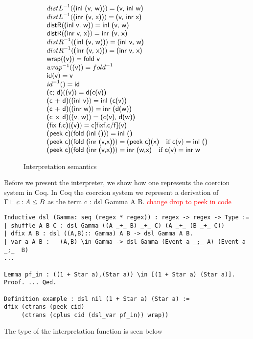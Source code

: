 \documentclass[a4paper,UKenglish,cleveref, autoref, thm-restate]{lipics-v2021}
\newcommand\mycomment[1]{\textcolor{red}{#1}}
\begin{document}
\begin{figure}
\begin{displaymath}
\begin{array}{l}
\iruleinv{distL}{(inl (v, w))}{(v, inl w)}\\
\iruleinv{distL}{(inr (v, x))}{(v, inr x)}\\
\irule{distR}{(inl v, w)}{inl (v, w)}\\
\irule{distR}{(inr v, x)}{inr (v, x)}\\
\iruleinv{distR}{(inl (v, w))}{(inl v, w)}\\
\iruleinv{distR}{(inr (v, x))}{(inr v, x)}\\
\irule{wrap}{(v)}{fold v}\\
\dslcominv{wrap}(\textsf{(v)})=\dslcominv{fold}\\
\irule{id}{v}{v}\\
\iruleinv{id}{}{id}\\
\irule{(c; d)}{(v)}{d(c(v))}\\
\irule{(c + d)}{(inl v)}{inl (c(v))}\\
\irule{(c + d)}{(inr w)}{inr (d(w))}\\
\irule{(c × d)}{(v, w)}{(c(v), d(w))}\\
\irule{(fix f.c)}{(v)}{c[fixf.c/f](v)}\\
\irule{(peek c)}{fold (inl ())}{inl ()}\\
\irule{(peek c)}{fold (inr (v,x))}{(peek c)(x)}\quad \text{if }\irule{c}{v}{inl ()}\\
\irule{(peek c)}{fold (inr (v,x))}{inr (w,x)}\quad \text{if }\irule{c}{v}{inr w}
    \end{array}
  \end{displaymath}
  \caption{Interpretation semantics}
\end{figure}
Before we present the interpreter, we show how one represents the coercion system in Coq.
In Coq the coercion system we represent a derivation of $\containsG{c}{A}{B}$ as the term  \textsf{c : dsl Gamma A B}.
\mycomment{change drop to peek in code}
\begin{verbatim}
Inductive dsl (Gamma: seq (regex * regex)) : regex -> regex -> Type := 
| shuffle A B C : dsl Gamma ((A _+_ B) _+_ C) (A _+_ (B _+_ C))
| dfix A B : dsl ((A,B):: Gamma) A B -> dsl Gamma A B.
| var a A B :   (A,B) \in Gamma -> dsl Gamma (Event a _;_ A) (Event a _;_  B) 
...

Lemma pf_in : ((1 + Star a),(Star a)) \in [(1 + Star a) (Star a)].
Proof. ... Qed.

Definition example : dsl nil (1 + Star a) (Star a) := 
dfix (ctrans (peek cid)
     (ctrans (cplus cid (dsl_var pf_in)) wrap))
\end{verbatim}
The type of the interpretation function is seen below
\end{document}
